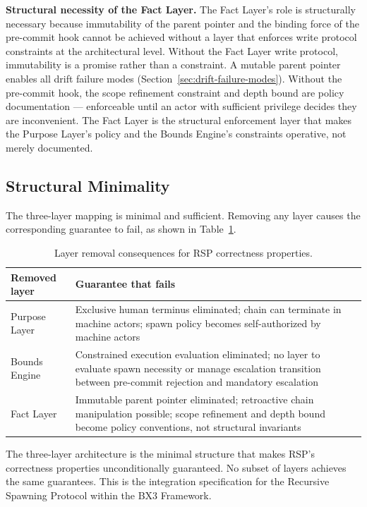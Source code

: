 \medskip
\noindent\textbf{Structural necessity of the Fact Layer.} The Fact Layer's role is structurally necessary because immutability of the parent pointer and the binding force of the pre-commit hook cannot be achieved without a layer that enforces write protocol constraints at the architectural level. Without the Fact Layer write protocol, immutability is a promise rather than a constraint. A mutable parent pointer enables all drift failure modes (Section~\ref{sec:drift-failure-modes}). Without the pre-commit hook, the scope refinement constraint and depth bound are policy documentation --- enforceable until an actor with sufficient privilege decides they are inconvenient. The Fact Layer is the structural enforcement layer that makes the Purpose Layer's policy and the Bounds Engine's constraints operative, not merely documented.

\subsection{Structural Minimality}
\label{sec:rs-minimality}

The three-layer mapping is minimal and sufficient. Removing any layer causes the corresponding guarantee to fail, as shown in Table~\ref{tab:rs-layer-minimality}.

\begin{table}[h]
\begin{center}
\begin{tabular}{p{3.4cm} p{4.6cm}}
\toprule
\textbf{Removed layer} & \textbf{Guarantee that fails} \\
\midrule
Purpose Layer & Exclusive human terminus eliminated; chain can terminate in machine actors; spawn policy becomes self-authorized by machine actors \\
Bounds Engine & Constrained execution evaluation eliminated; no layer to evaluate spawn necessity or manage escalation transition between pre-commit rejection and mandatory escalation \\
Fact Layer & Immutable parent pointer eliminated; retroactive chain manipulation possible; scope refinement and depth bound become policy conventions, not structural invariants \\
\bottomrule
\end{tabular}
\caption{Layer removal consequences for RSP correctness properties.}
\label{tab:rs-layer-minimality}
\end{center}
\end{table}

The three-layer architecture is the minimal structure that makes RSP's correctness properties unconditionally guaranteed. No subset of layers achieves the same guarantees. This is the integration specification for the Recursive Spawning Protocol within the BX3 Framework.
